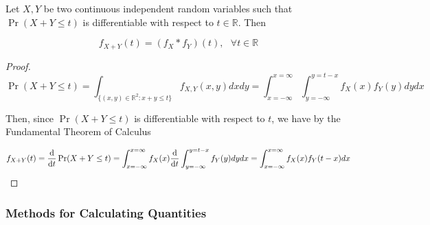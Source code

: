 \begin{proposition} Let \(X, Y\) be two continuous independent random variables such that \(\Pr(X +Y \leq t)\) is differentiable with respect to \(t \in \mathbb{R}\). Then

\[
f_{X+Y}(t) = (f_X * f_Y)(t) , \ \ \ \forall t \in \mathbb{R}
\]

\begin{proof}
\[
\Pr(X+Y \leq t) = \int_{\{(x,y) \in \mathbb{R}^2 : x+y \leq t\}} f_{X,Y}(x,y)dxdy = \int_{x=-\infty}^{x=\infty} \int_{y=-\infty}^{y=t-x} f_{X}(x) f_Y(y)dy dx
\]

Then, since \(\Pr(X+Y \leq t)\) is differentiable with respect to \(t\), we have by the Fundamental Theorem of Calculus

\[
f_{X+Y}(t) = \deriv{}{t} \Pr(X+Y \leq t) = \int_{x=-\infty}^{x=\infty} f_{X}(x) \deriv{}{t} \int_{y=-\infty}^{y=t-x}  f_Y(y)dy dx = \int_{x=-\infty}^{x=\infty} f_X(x) f_Y(t-x) dx
\]
\end{proof}

\end{proposition}
\subsubsection{Methods for Calculating Quantities}

